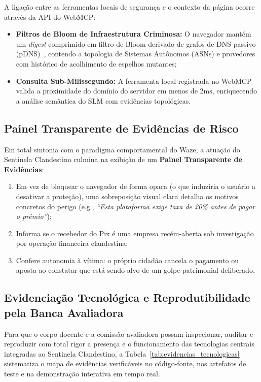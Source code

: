 A liga\c{c}\~{a}o entre as ferramentas locais de seguran\c{c}a e o contexto da p\'{a}gina ocorre atrav\'{e}s da API do WebMCP:
\begin{itemize}
    \item \textbf{Filtros de Bloom de Infraestrutura Criminosa:} O navegador mant\'{e}m um \textit{digest} comprimido em filtro de Bloom derivado de grafos de DNS passivo (pDNS)~\cite{nabeel2020following}, contendo a topologia de Sistemas Aut\^{o}nomos (ASNs) e provedores com hist\'{o}rico de acolhimento de espelhos mutantes;
    \item \textbf{Consulta Sub-Milissegundo:} A ferramenta local registrada no WebMCP valida a proximidade do dom\'{i}nio do servidor em menos de $2\text{ms}$, enriquecendo a an\'{a}lise sem\^{a}ntica do SLM com evid\^{e}ncias topol\'{o}gicas.
\end{itemize}

\subsection{Painel Transparente de Evid\^{e}ncias de Risco}

Em total sintonia com o paradigma comportamental do Waze, a atua\c{c}\~{a}o do Sentinela Clandestino culmina na exibi\c{c}\~{a}o de um \textbf{Painel Transparente de Evid\^{e}ncias}:
\begin{enumerate}
    \item Em vez de bloquear o navegador de forma opaca (o que induziria o usu\'{a}rio a desativar a prote\c{c}\~{a}o), uma sobreposi\c{c}\~{a}o visual clara detalha os motivos concretos do perigo (e.g., \textit{``Esta plataforma exige taxa de 20\% antes de pagar o pr\^{e}mio''});
    \item Informa se o recebedor do Pix \'{e} uma empresa rec\'{e}m-aberta sob investiga\c{c}\~{a}o por opera\c{c}\~{a}o financeira clandestina;
    \item Confere autonomia \`{a} v\'{i}tima: o pr\'{o}prio cidad\~{a}o cancela o pagamento ou aposta ao constatar que est\'{a} sendo alvo de um golpe patrimonial deliberado.
\end{enumerate}

\subsection{Evidencia\c{c}\~{a}o Tecnol\'{o}gica e Reprodutibilidade pela Banca Avaliadora}
\label{sec:evidenciacao_tecnologica}

Para que o corpo docente e a comiss\~{a}o avaliadora possam inspecionar, auditar e reproduzir com total rigor a presen\c{c}a e o funcionamento das tecnologias centrais integradas ao Sentinela Clandestino, a Tabela~\ref{tab:evidencias_tecnologicas} sistematiza o mapa de evid\^{e}ncias verific\'{a}veis no c\'{o}digo-fonte, nos artefatos de teste e na demonstra\c{c}\~{a}o interativa em tempo real.

